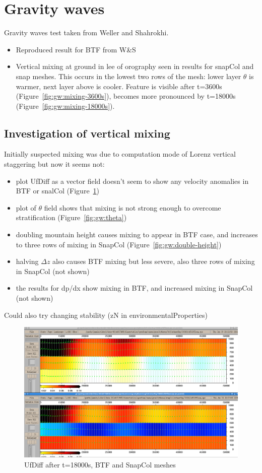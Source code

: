 \section{Gravity waves}

Gravity waves test taken from Weller and Shahrokhi.

\begin{itemize}
\item Reproduced result for BTF from W\&S
\item Vertical mixing at ground in lee of orography seen in results for snapCol and snap meshes.  This occurs in the lowest two rows of the mesh: lower layer $\theta$ is warmer, next layer above is cooler.  Feature is visible after t=3600s (Figure~\ref{fig:gw:mixing-3600s}), becomes more pronounced by t=18000s (Figure~\ref{fig:gw:mixing-18000s}).
\end{itemize}

\subsection{Investigation of vertical mixing}
Initially suspected mixing was due to computation mode of Lorenz vertical staggering but now it seems not:
\begin{itemize}
	\item plot UfDiff as a vector field doesn't seem to show any velocity anomalies in BTF or snalCol (Figure~\ref{fig:gw:ufdiff})
	\item plot of $\theta$ field shows that mixing is not strong enough to overcome stratification (Figure~\ref{fig:gw:theta})
	\item doubling mountain height causes mixing to appear in BTF case, and increases to three rows of mixing in SnapCol (Figure~\ref{fig:gw:double-height})
	\item halving $\Delta z$ also causes BTF mixing but less severe, also three rows of mixing in SnapCol (not shown)
	\item the results for dp/dx show mixing in BTF, and increased mixing in SnapCol (not shown)
\end{itemize}
Could also try changing stability (zN in environmentalProperties)

\begin{figure}
	\includegraphics[width=\textwidth]{interim-results/gravityWavesBTFSnapColVelocityVectors.png}
	\caption{UfDiff after t=18000s, BTF and SnapCol meshes}
	\label{fig:gw:ufdiff}
\end{figure}

